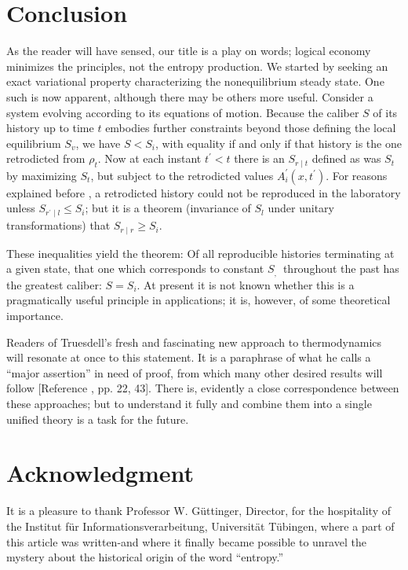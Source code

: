 \documentclass{article}
\begin{document}
\section{Conclusion}

As the reader will have sensed, our title is a play on words; logical economy minimizes the principles, not the entropy production. We started by seeking an exact variational property characterizing the nonequilibrium steady state. One such is now apparent, although there may be others more useful. Consider a system evolving according to its equations of motion. Because the caliber $S$ of its history up to time $t$ embodies further constraints beyond those defining the local equilibrium $S_v$, we have $S<S_i$, with equality if and only if that history is the one retrodicted from $\rho_t$. Now at each instant $t^{\prime}<t$ there is an $S_{r \mid t}$ defined as was $S_t$ by maximizing $S_t$, but subject to the retrodicted values $A_i^{\prime}\left(x, t^{\prime}\right)$. For reasons explained before \cite{jaynes1963}, a retrodicted history could not be reproduced in the laboratory unless $S_{r^{\prime} \mid l} \leqslant S_i$; but it is a theorem (invariance of $S_l$ under unitary transformations) that $S_{r \mid r} \geqslant S_i$.

These inequalities yield the theorem: Of all reproducible histories terminating at a given state, that one which corresponds to constant $S_{\text {, }}$ throughout the past has the greatest caliber: $S=S_i$. At present it is not known whether this is a pragmatically useful principle in applications; it is, however, of some theoretical importance.

Readers of Truesdell's fresh and fascinating new approach to thermodynamics \cite{truesdell1969} will resonate at once to this statement. It is a paraphrase of what he calls a ``major assertion'' in need of proof, from which many other desired results will follow [Reference \cite{truesdell1969}, pp. 22, 43]. There is, evidently a close correspondence between these approaches; but to understand it fully and combine them into a single unified theory is a task for the future.

\section*{Acknowledgment}

It is a pleasure to thank Professor W. Güttinger, Director, for the hospitality of the Institut für Informationsverarbeitung, Universität Tübingen, where a part of this article was written-and where it finally became possible to unravel the mystery about the historical origin of the word ``entropy.''
\end{document}

